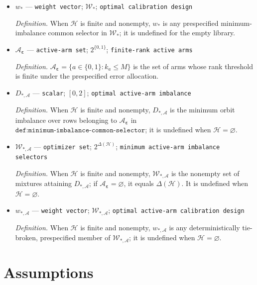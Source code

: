 \documentclass{article}
\begin{document}
\begin{itemize}
  \item \(w_*\) --- \texttt{weight vector}; \(\mathcal W_*\); \texttt{optimal calibration design}
  \par\smallskip\noindent\emph{Definition.} When \(\mathcal H\) is finite and nonempty, \(w_*\) is any prespecified minimum-imbalance common selector in \(\mathcal W_*\); it is undefined for the empty library.
  \item \(\mathcal A_{\boldsymbol\varepsilon}\) --- \texttt{active-\allowbreak{}arm set}; \(2^{\{0,1\}}\); \texttt{finite-\allowbreak{}rank active arms}
  \par\smallskip\noindent\emph{Definition.} \(\mathcal A_{\boldsymbol\varepsilon}=\{a\in\{0,1\}:k_a\le M\}\) is the set of arms whose rank threshold is finite under the prespecified error allocation.
  \item \(D_{*,\mathcal A}\) --- \texttt{scalar}; \([0,2]\); \texttt{optimal active-\allowbreak{}arm imbalance}
  \par\smallskip\noindent\emph{Definition.} When \(\mathcal H\) is finite and nonempty, \(D_{*,\mathcal A}\) is the minimum orbit imbalance over rows belonging to \(\mathcal A_{\boldsymbol\varepsilon}\) in \(\texttt{def:minimum-imbalance-common-selector}\); it is undefined when \(\mathcal H=\varnothing\).
  \item \(\mathcal W_{*,\mathcal A}\) --- \texttt{optimizer set}; \(2^{\Delta(\mathcal H)}\); \texttt{minimum active-\allowbreak{}arm imbalance selectors}
  \par\smallskip\noindent\emph{Definition.} When \(\mathcal H\) is finite and nonempty, \(\mathcal W_{*,\mathcal A}\) is the nonempty set of mixtures attaining \(D_{*,\mathcal A}\); if \(\mathcal A_{\boldsymbol\varepsilon}=\varnothing\), it equals \(\Delta(\mathcal H)\). It is undefined when \(\mathcal H=\varnothing\).
  \item \(w_{*,\mathcal A}\) --- \texttt{weight vector}; \(\mathcal W_{*,\mathcal A}\); \texttt{optimal active-\allowbreak{}arm calibration design}
  \par\smallskip\noindent\emph{Definition.} When \(\mathcal H\) is finite and nonempty, \(w_{*,\mathcal A}\) is any deterministically tie-broken, prespecified member of \(\mathcal W_{*,\mathcal A}\); it is undefined when \(\mathcal H=\varnothing\).
\end{itemize}

\section{Assumptions}
\end{document}
